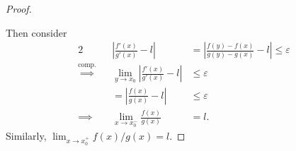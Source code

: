 \documentclass{article}
\newcommand{\?}{\stackrel{?}{=}}
\theoremstyle{definition} %
\begin{document}
\begin{itemize}
\begin{proof}
\begin{center}
        \end{center}
        Then consider
        \begin{alignat*}{2}
            &&\left|\frac{f'(x)}{g'(x)} - l \right| &= \left|\frac{f(y) - f(x)}{g(y) - g(x)} - l\right| \leq \varepsilon \\
            \overset{\text{comp.}}{\implies}&& \lim_{y \to x_0}  \left|\frac{f'(x)}{g'(x)} - l \right| &\leq \varepsilon \\
            && = \left|\frac{f(x)}{g(x)} - l \right| &\leq \varepsilon \\
            \implies&& \lim_{x \to x_0^-} \frac{f(x)}{g(x)} &= l.
        \end{alignat*}
        Similarly, $\lim_{x \to x_0^+} f(x)/g(x) = l$.
     \end{proof}
\end{itemize}

\newpage

\listoftheorems[]
\end{document}
